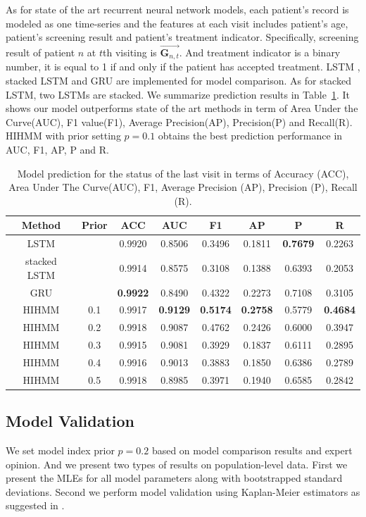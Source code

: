 \documentclass{article}
\begin{document}
As for state of the art recurrent neural network models, each patient's record is modeled as one time-series and the features at each visit includes patient's age, patient's screening result and patient's treatment indicator. Specifically, screening result of patient $n$ at $t$th visiting is $\vec{\bm G_{n,t}}$. And treatment indicator is a binary number, it is equal to 1 if and only if the patient has accepted treatment. LSTM \citep{Cho_2014}, stacked LSTM \citep{Dyer_2015} and GRU \citep{Chung_2014} are implemented for model comparison. As for stacked LSTM, two LSTMs are stacked. We summarize prediction results in Table~\ref{Model_Comparison}. It shows our model outperforms state of the art methods in term of Area Under the Curve(AUC), F1 value(F1), Average Precision(AP), Precision(P) and Recall(R). HIHMM with prior setting $p = 0.1$ obtains the best prediction performance in AUC, F1, AP, P and R.

\begin{table}[ht!]
	\centering
	\caption{Model prediction for the status of the last visit in terms of Accuracy (ACC), Area Under The Curve(AUC), F1, Average Precision (AP), Precision (P), Recall (R).}
	\begin{tabular}{|c|c|c|c|c|c|c|c|}
		\hline
		Method & Prior & ACC & AUC & F1 & AP & P & R \\
		\hline
		LSTM &  & 0.9920 & 0.8506 & 0.3496 & 0.1811 & \textbf{0.7679} & 0.2263 \\
		\hline
		stacked LSTM &  & 0.9914 & 0.8575 & 0.3108 & 0.1388 & 0.6393 & 0.2053 \\
		\hline
		GRU &  & \textbf{0.9922} & 0.8490 & 0.4322 & 0.2273 & 0.7108 & 0.3105 \\
		\hline
		HIHMM & 0.1 & 0.9917 & \textbf{0.9129} & \textbf{0.5174} & \textbf{0.2758} & 0.5779 & \textbf{0.4684} \\
		\hline
		HIHMM & 0.2 & 0.9918 & 0.9087 & 0.4762 & 0.2426 & 0.6000 & 0.3947 \\
		\hline
		HIHMM & 0.3 & 0.9915 & 0.9081 & 0.3929 & 0.1837 & 0.6111 & 0.2895 \\
		\hline
		HIHMM & 0.4 & 0.9916 & 0.9013 & 0.3883 & 0.1850 & 0.6386 & 0.2789 \\
		\hline
		HIHMM & 0.5 & 0.9918 & 0.8985 & 0.3971 & 0.1940 & 0.6585 & 0.2842 \\
		\hline
	\end{tabular}
	\label{Model_Comparison}
\end{table}


\subsection{Model Validation}
We set model index prior $p = 0.2$ based on model comparison results and expert opinion. And we present two types of results on population-level data. First we present the MLEs for all model parameters along with bootstrapped standard deviations. Second we perform model validation using Kaplan-Meier estimators as suggested in \cite{titman_general_2008}.
\end{document}
